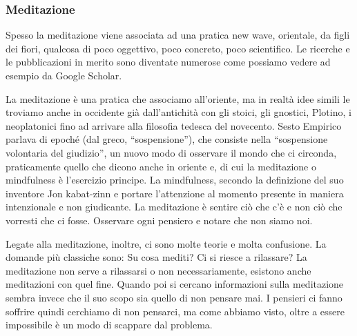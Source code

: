 \documentclass[12pt]{book} %
\begin{document}
\subsubsection{Meditazione}
Spesso la meditazione viene associata
ad una pratica new wave, orientale, da figli dei fiori, qualcosa di poco oggettivo, poco concreto, poco scientifico. Le
ricerche e le pubblicazioni in merito sono diventate numerose come possiamo vedere ad esempio da Google Scholar.

La meditazione è una pratica che associamo all'oriente, ma in realtà idee simili le troviamo anche in occidente già dall'antichità con gli stoici, gli
gnostici, Plotino, i neoplatonici fino ad arrivare alla filosofia tedesca del novecento. Sesto Empirico parlava di
epoché (dal greco, “sospensione”), che consiste nella “sospensione volontaria del giudizio”, un nuovo modo di osservare
il mondo che ci circonda, praticamente quello che dicono anche in oriente e, di cui la meditazione o mindfulness è l'esercizio principe. La mindfulness, secondo la definizione del suo inventore Jon kabat-zinn e portare l'attenzione al momento presente in maniera intenzionale e non giudicante.
La meditazione è sentire ciò che c'è e non ciò che vorresti che ci fosse. Osservare ogni pensiero e notare che non siamo noi.

Legate alla meditazione, inoltre, ci sono molte teorie e molta confusione. La domande più classiche sono: Su cosa mediti? Ci si riesce a rilassare?
La meditazione non serve a rilassarsi o non necessariamente, esistono anche meditazioni con quel fine. 
Quando poi si cercano informazioni sulla meditazione sembra invece che il suo scopo sia quello di non pensare mai. 
I pensieri ci fanno soffrire quindi cerchiamo di non pensarci, ma come abbiamo visto, oltre a essere impossibile è un modo di scappare dal problema.
\end{document}
